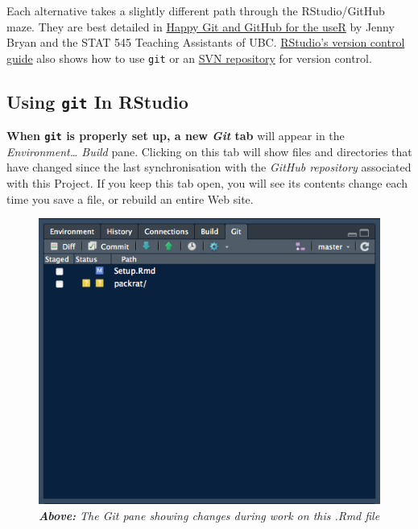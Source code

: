 \documentclass[]{book}
\theoremstyle{definition}
\theoremstyle{definition}
\theoremstyle{definition}
\theoremstyle{remark}
\begin{document}
Each alternative takes a slightly different path through the
RStudio/GitHub maze. They are best detailed in
\href{http://happygitwithr.com/}{Happy Git and GitHub for the useR} by
Jenny Bryan and the STAT 545 Teaching Assistants of UBC.
\href{https://support.rstudio.com/hc/en-us/articles/200532077-Version-Control-with-Git-and-SVN}{RStudio's
version control guide} also shows how to use \texttt{git} or an
\href{http://subversion.apache.org/}{SVN repository} for version
control.

\hypertarget{using-git-in-rstudio}{%
\subsection{\texorpdfstring{Using \texttt{git} In
RStudio}{Using git In RStudio}}\label{using-git-in-rstudio}}

\textbf{When \texttt{git} is properly set up, a new \emph{Git} tab} will
appear in the \emph{Environment\ldots{} Build} pane. Clicking on this
tab will show files and directories that have changed since the last
synchronisation with the \emph{GitHub repository} associated with this
Project. If you keep this tab open, you will see its contents change
each time you save a file, or rebuild an entire Web site.

\begin{figure}
\centering
\includegraphics{images/RStudio_git_pane.png}
\caption{\emph{\textbf{Above:} The Git pane showing changes during work
on this .Rmd file}}
\end{figure}
\end{document}
